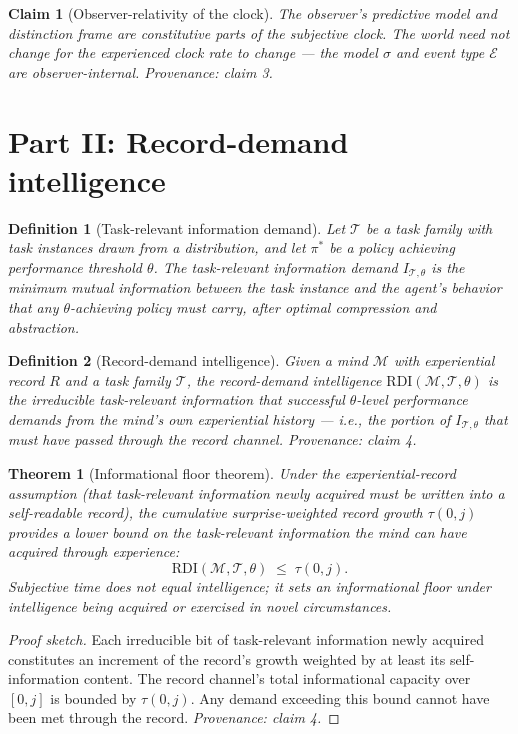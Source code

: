 \documentclass[11pt]{article}
\newtheorem{definition}{Definition}
\newtheorem{claim}{Claim}
\newtheorem{theorem}{Theorem}
\begin{document}
\begin{claim}[Observer-relativity of the clock]
The observer's predictive model and distinction frame are constitutive parts of the subjective clock. The world need not change for the experienced clock rate to change --- the model $\sigma$ and event type $\mathcal{E}$ are observer-internal.
\emph{Provenance: claim 3.}
\end{claim}

\section{Part II: Record-demand intelligence}

\begin{definition}[Task-relevant information demand]
\label{def:taskinfo}
Let $\mathcal{T}$ be a task family with task instances drawn from a distribution, and let $\pi^*$ be a policy achieving performance threshold $\theta$. The \emph{task-relevant information demand} $I_{\mathcal{T},\theta}$ is the minimum mutual information between the task instance and the agent's behavior that any $\theta$-achieving policy must carry, after optimal compression and abstraction.
\end{definition}

\begin{definition}[Record-demand intelligence]
\label{def:rdi}
Given a mind $\mathcal{M}$ with experiential record $R$ and a task family $\mathcal{T}$, the \emph{record-demand intelligence} $\mathrm{RDI}(\mathcal{M}, \mathcal{T}, \theta)$ is the irreducible task-relevant information that successful $\theta$-level performance demands from the mind's own experiential history --- i.e., the portion of $I_{\mathcal{T},\theta}$ that must have passed through the record channel.
\emph{Provenance: claim 4.}
\end{definition}

\begin{theorem}[Informational floor theorem]
\label{thm:floor}
Under the experiential-record assumption (that task-relevant information newly acquired must be written into a self-readable record), the cumulative surprise-weighted record growth $\tau(0,j)$ provides a lower bound on the task-relevant information the mind can have acquired through experience:
\[
  \mathrm{RDI}(\mathcal{M}, \mathcal{T}, \theta) \;\leq\; \tau(0,j).
\]
Subjective time does not equal intelligence; it sets an informational floor under intelligence being acquired or exercised in novel circumstances.
\end{theorem}
\begin{proof}[Proof sketch]
Each irreducible bit of task-relevant information newly acquired constitutes an increment of the record's growth weighted by at least its self-information content. The record channel's total informational capacity over $[0,j]$ is bounded by $\tau(0,j)$. Any demand exceeding this bound cannot have been met through the record.
\emph{Provenance: claim 4.}
\end{proof}
\end{document}
